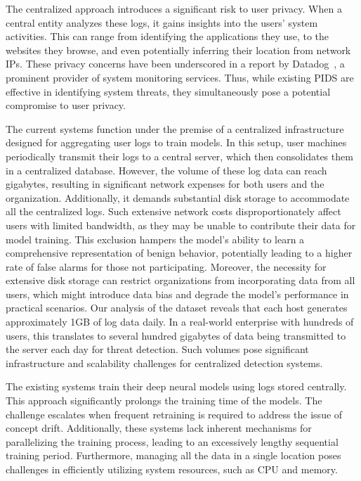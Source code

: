 The centralized approach introduces a significant risk to user privacy. When a central entity analyzes these logs, it gains insights into the users' system activities. This can range from identifying the applications they use, to the websites they browse, and even potentially inferring their location from network IPs. These privacy concerns have been underscored in a report by Datadog~\cite{datadog}, a prominent provider of system monitoring services. Thus, while existing PIDS are effective in identifying system threats, they simultaneously pose a potential compromise to user privacy.

 The current systems function under the premise of a centralized infrastructure designed for aggregating user logs to train models. In this setup, user machines periodically transmit their logs to a central server, which then consolidates them in a centralized database. However, the volume of these log data can reach gigabytes, resulting in significant network expenses for both users and the organization. Additionally, it demands substantial disk storage to accommodate all the centralized logs. Such extensive network costs disproportionately affect users with limited bandwidth, as they may be unable to contribute their data for model training. This exclusion hampers the model's ability to learn a comprehensive representation of benign behavior, potentially leading to a higher rate of false alarms for those not participating. Moreover, the necessity for extensive disk storage can restrict organizations from incorporating data from all users, which might introduce data bias and degrade the model's performance in practical scenarios. Our analysis of the \optc dataset reveals that each host generates approximately 1GB of log data daily. In a real-world enterprise with hundreds of users, this translates to several hundred gigabytes of data being transmitted to the server each day for threat detection. Such volumes pose significant infrastructure and scalability challenges for centralized detection systems.

 The existing systems train their deep neural models using logs stored centrally. This approach significantly prolongs the training time of the models. The challenge escalates when frequent retraining is required to address the issue of concept drift\Fix{~\cite{}}. Additionally, these systems lack inherent mechanisms for parallelizing the training process, leading to an excessively lengthy sequential training period\Fix{~\cite{}}. Furthermore, managing all the data in a single location poses challenges in efficiently utilizing system resources, such as CPU and memory.

